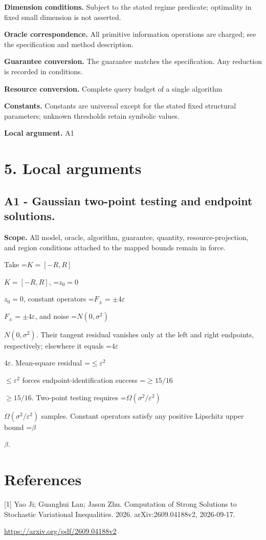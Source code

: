 \documentclass[10pt,a4paper]{article}
\newcommand{\AtlasMath}[1]{\par\begingroup\centering\setbox0=\hbox{$\displaystyle #1$}\ifdim\wd0>1.4\linewidth\typeout{ATLAS WIDE FORMULA: \the\wd0}\fi\ifdim\wd0>\linewidth\resizebox{\linewidth}{!}{\box0}\else\box0\fi\par\endgroup}
\newcommand{\AtlasInlineMath}[1]{\begingroup\setbox0=\hbox{$#1$}\ifdim\wd0>.4\linewidth\endgroup\AtlasMath{#1}\else\endgroup$#1$\fi}
\begin{document}
\textbf{Dimension conditions.} Subject to the stated regime predicate; optimality in fixed small dimension is not asserted.

\textbf{Oracle correspondence.} All primitive information operations are charged; see the specification and method description.

\textbf{Guarantee conversion.} The guarantee matches the specification. Any reduction is recorded in conditions.

\textbf{Resource conversion.} Complete query budget of a single algorithm

\textbf{Constants.} Constants are universal except for the stated fixed structural parameters; unknown thresholds retain symbolic values.

\textbf{Local argument.} A1

\section{5. Local arguments}
\subsection{A1 - Gaussian two-point testing and endpoint solutions.}
\textbf{Scope.} All model, oracle, algorithm, guarantee, quantity, resource-projection, and region conditions attached to the mapped bounds remain in force.

Take \AtlasInlineMath{K=[-R,R]}, \AtlasInlineMath{z_0=0}, constant operators \AtlasInlineMath{F_\pm=\pm4\varepsilon}, and noise \AtlasInlineMath{N(0,\sigma^2)}. Their tangent residual vanishes only at the left and right endpoints, respectively; elsewhere it equals \AtlasInlineMath{4\varepsilon}. Mean-square residual \AtlasInlineMath{\le\varepsilon^2} forces endpoint-identification success \AtlasInlineMath{\ge15/16}. Two-point testing requires \AtlasInlineMath{\Omega(\sigma^2/\varepsilon^2)} samples. Constant operators satisfy any positive Lipschitz upper bound \AtlasInlineMath{\beta}.

\section{References}
[1] Yao Ji; Guanghui Lan; Jason Zhu. Computation of Strong Solutions to Stochastic Variational Inequalities. 2026. arXiv:2609.04188v2, 2026-09-17.

\url{https://arxiv.org/pdf/2609.04188v2}
\end{document}
